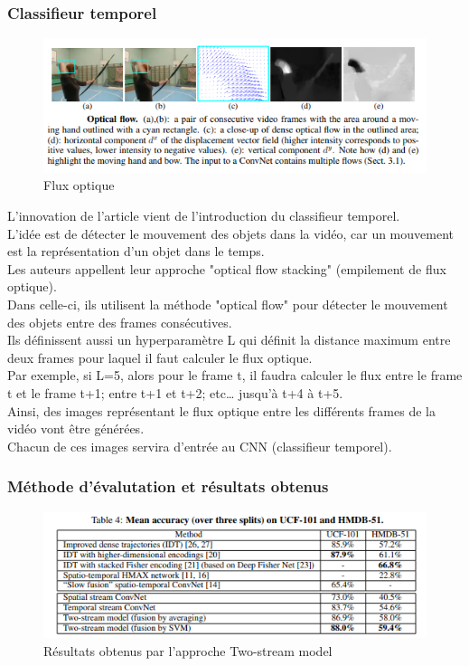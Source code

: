 \documentclass[11pt]{article}
\begin{document}
\subsubsection{Classifieur temporel}
\label{sec:org68bdd4d}
\begin{figure}[htbp]
\centering
\includegraphics[width=12cm]{optical_flow.png}
\caption{Flux optique \label{optical-flow} \label{opt-flow}}
\end{figure}
L'innovation de l'article vient de l'introduction du classifieur temporel.\\

L'idée est de détecter le mouvement des objets dans la vidéo, car un mouvement est la représentation d'un objet dans le temps.\\
Les auteurs appellent leur approche "optical flow stacking" (empilement de flux optique).\\

Dans celle-ci, ils utilisent la méthode "optical flow" pour détecter le mouvement des objets entre des frames consécutives.\\

Ils définissent aussi un hyperparamètre L qui définit la distance maximum entre deux frames pour laquel il faut calculer le flux optique.\\
Par exemple, si L=5, alors pour le frame t, il faudra calculer le flux entre le frame t et le frame t+1; entre t+1 et t+2; etc\ldots{} jusqu'à t+4 à t+5.\\
Ainsi, des images représentant le flux optique entre les différents frames de la vidéo vont être générées.\\

Chacun de ces images servira d'entrée au CNN (classifieur temporel).\\
\subsubsection{Méthode d'évalutation et résultats obtenus}
\label{sec:org5cc2b1d}
\begin{figure}[htbp]
\centering
\includegraphics[width=13cm]{two_stream_res.png}
\caption{Résultats obtenus par l'approche Two-stream model \label{two-stream-res}}
\end{figure}
\end{document}
